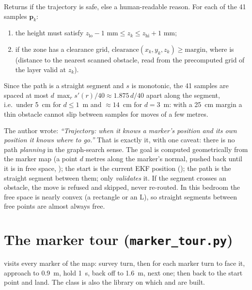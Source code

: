 Returns  if the trajectory is safe, else a human-readable reason. For each of the 41 samples
$\mathbf p_k$:
\begin{enumerate}[nosep]
  \item the height must satisfy $z_{\text{lo}} - 1\text{ mm} \le z_k \le z_{\text{hi}} + 1\text{ mm}$;
  \item if the zone has a clearance grid, $\text{clearance}(x_k, y_k, z_k) \ge \text{margin}$, where
         is  (distance to the nearest scanned obstacle, read from the
        precomputed grid of the layer valid at $z_k$).
\end{enumerate}
Since the path is a straight segment and $s$ is monotonic, the 41 samples are spaced at most
$d\,\max_r s'(r)/40 \approx 1.875\,d/40$ apart along the segment, i.e.\ under 5~cm for $d \le 1$~m and
$\approx 14$~cm for $d=3$~m: with a 25~cm margin a thin obstacle cannot slip between samples for moves of a few
metres.

\begin{intuition}
The author wrote: \emph{``Trajectory: when it knows a marker's position and its own position it knows where to
go.''} That is exactly it, with one caveat: there is no path \emph{planning} in the graph-search sense. The goal
is computed geometrically from the marker map (a point $d$ metres along the marker's normal, pushed back until it
is in free space, ); the start is the current EKF position ();
the path is the straight segment between them;  only \emph{validates} it. If the segment crosses an
obstacle, the move is refused and skipped, never re-routed. In this bedroom the free space is nearly convex (a
rectangle or an L), so straight segments between free points are almost always free.
\end{intuition}

\section{The marker tour (\texorpdfstring{\texttt{marker\_tour.py}}{marker\_tour.py})}

 visits every marker of the map: survey turn, then for each marker turn to face it,
approach to 0.9~m, hold 1~s, back off to 1.6~m, next one; then back to the start point and land. The class is
also the library on which  and  are built.

